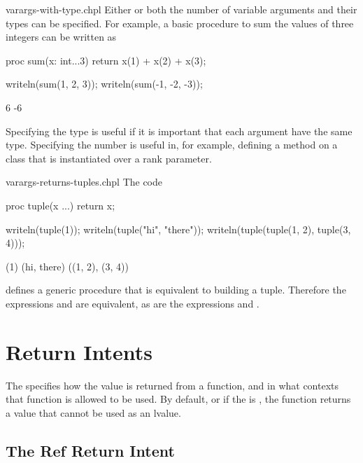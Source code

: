 \begin{chapelexample}{varargs-with-type.chpl}
Either or both the number of variable arguments and their types can be
specified.  For example, a basic procedure to sum the values of three
integers can be written as
\begin{chapel}
proc sum(x: int...3) return x(1) + x(2) + x(3);
\end{chapel}
\begin{chapelpost}
writeln(sum(1, 2, 3));
writeln(sum(-1, -2, -3));
\end{chapelpost}
\begin{chapeloutput}
6
-6
\end{chapeloutput}
Specifying the type is useful if it is important that each argument
have the same type.  Specifying the number is useful in, for example,
defining a method on a class that is instantiated over a rank
parameter.
\end{chapelexample}

\begin{chapelexample}{varargs-returns-tuples.chpl}
The code
\begin{chapel}
proc tuple(x ...) return x;
\end{chapel}
\begin{chapelpost}
writeln(tuple(1));
writeln(tuple("hi", "there"));
writeln(tuple(tuple(1, 2), tuple(3, 4)));
\end{chapelpost}
\begin{chapeloutput}
(1)
(hi, there)
((1, 2), (3, 4))
\end{chapeloutput}
defines a generic procedure that is equivalent to building a tuple.
Therefore the expressions  and  are equivalent,
as are the expressions  and .
\end{chapelexample}


\section{Return Intents}
\label{Return_Intent}

The  specifies how the value is returned from a function,
and in what contexts that function is allowed to be used.  By default, or if
the  is , the function returns a value that
cannot be used as an lvalue.

\subsection{The Ref Return Intent}
\label{Ref_Return_Intent}

